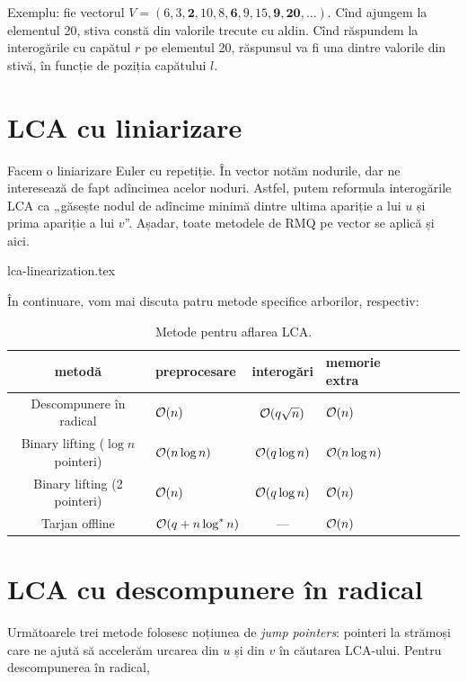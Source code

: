 \documentclass[../main.tex]{subfiles}
\begin{document}
Exemplu: fie vectorul $V=(6, 3, \mathbf{2}, 10, 8, \mathbf{6}, 9, 15, \mathbf{9}, \mathbf{20}, \dots)$. Cînd ajungem la elementul 20, stiva constă din valorile trecute cu aldin. Cînd răspundem la interogările cu capătul $r$ pe elementul 20, răspunsul va fi una dintre valorile din stivă, în funcție de poziția capătului $l$.

\section{LCA cu liniarizare}

Facem o liniarizare Euler cu repetiție. În vector notăm nodurile, dar ne interesează de fapt adîncimea acelor noduri. Astfel, putem reformula interogările LCA ca „găsește nodul de adîncime minimă dintre ultima apariție a lui $u$ și prima apariție a lui $v$”. Așadar, toate metodele de RMQ pe vector se aplică și aici.

{lca-linearization.tex}

În continuare, vom mai discuta patru metode specifice arborilor, respectiv:

\begin{table}[!htbp]
  \centering
  \begin{tabular}{SlSlSlSl}
    \textbf{metodă} & \textbf{preprocesare} & \textbf{interogări} & \textbf{memorie extra} \\
    \hline
    Descompunere în radical & $\mathcal{O}(n)$ & $\mathcal{O}(q \sqrt{n})$ & $\mathcal{O}(n)$ \\
    Binary lifting ($\log n$ pointeri) & $\mathcal{O}(n \log n)$ & $\mathcal{O}(q \log n)$ & $\mathcal{O}(n \log n)$ \\
    Binary lifting (2 pointeri) & $\mathcal{O}(n)$ & $\mathcal{O}(q \log n)$ & $\mathcal{O}(n)$ \\
    Tarjan offline & $\mathcal{O}(q + n \log^{*} n)$ & --- & $\mathcal{O}(n)$ \\
    \hline
  \end{tabular}

  \caption{Metode pentru aflarea LCA.}
\end{table}

\section{LCA cu descompunere în radical}

Următoarele trei metode folosesc noțiunea de \textit{jump pointers}: pointeri la strămoși care ne ajută să accelerăm urcarea din $u$ și din $v$ în căutarea LCA-ului. Pentru descompunerea în radical,
\end{document}

